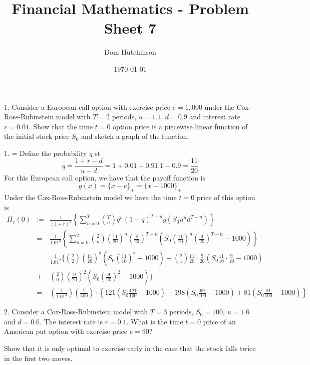 \documentclass[11pt,a4paper]{article}
\begin{document}
\questionsfalse

\title{Financial Mathematics - Problem Sheet 7}
\author{Dom Hutchinson}
\date{\today}
\maketitle

\begin{question}{1.}
  Consider a European call option with exercise price $e=1,000$ under the Cox-Ross-Rubinstein model with $T=2$ periods, $u=1.1$, $d=0.9$ and interest rate $r=0.01$. Show that the time $t=0$ option price is a piecewise linear function of the initial stock price $S_0$ and sketch a graph of the function.
\end{question}

\begin{answer}{1.}
  \everymath={\displaystyle}
  Define the probability $q$ st
  \[ q=\frac{1+r-d}{u-d}={1+0.01-0.9}{1.1-0.9}=\frac{11}{20} \]
  For this European call option, we have that the payoff function is
  \[ g(x)=\{x-e\}_+=\{x-1000\}_+ \]
  Under the Cox-Ross-Rubinstein model we have the time $t=0$ price of this option is
  \[\begin{array}{rrl}
    \Pi_e(0)&:=&\frac{1}{(1+r)^2}\left\{\sum_{n=0}^T{T\choose n}q^n(1-q)^{T-n}g(S_0u^nd^{T-n})\right\}\\
    &=&\frac1{1.01^2}\left\{\sum_{n=0}^2{2\choose n}\left(\frac{11}{20}\right)^n\left(\frac{8}{20}\right)^{T-n}\left(S_0\left(\frac{11}{10}\right)^n\left(\frac{9}{20}\right)^{T-n}-1000\right)\right\}\\
    &=&\frac1{1.01^2}\Bigg\{{2\choose2}\left(\frac{11}{20}\right)^2\left(S_0\left(\frac{11}{10}\right)^2-1000\right)+{2\choose1}\frac{11}{20}\cdot\frac{9}{20}\left(S_0\frac{11}{10}\cdot\frac9{10}-1000\right)\\
    &+&{2\choose0}\left(\frac{9}{20}\right)^2\left(S_0\left(\frac{9}{20}\right)^2-1000\right)\Bigg\}\\
    &=&\left(\frac{1}{1.01^2}\right)\left(\frac1{400}\right)\cdot\left\{121\left(S_0\frac{121}{100}-1000\right)+198\left(S_0\frac{99}{100}-1000\right)+81\left(S_0\frac{81}{100}-1000\right)\right\}
  \end{array}\]
\end{answer}

\begin{question}{2.}
  Consider a Cox-Ross-Rubinstein model with $T=3$ periods, $S_0=100$, $u=1.6$ and $d=0.6$. The interest rate is $r=0.1$. What is the time $t=0$ price of an American put option with exercise price $e=90$?
  \par Show that it is only optimal to exercise early in the case that the stock falls twice in the first two moves.
\end{question}
\end{document}
